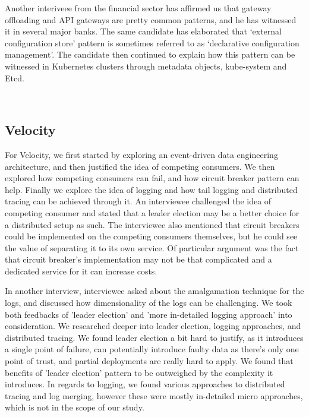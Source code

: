 \documentclass{bmcart}
\begin{document}
Another interiveee from the financial sector has affirmed us that gateway offloading and API gateways are pretty common patterns, and he has witnessed it in several major banks. The same candidate has elaborated that `external configuration store' pattern is sometimes referred to as `declarative configuration management'. The candidate then continued to explain how this pattern can be witnessed in Kubernetes clusters through metadata objects, kube-system and Etcd.


\,

\setlength{\fboxsep}{0.7em}
\noindent{}


\subsection{Velocity}

For Velocity, we first started by exploring an event-driven data engineering architecture, and then justified the idea of competing consumers. We then explored how competing consumers can fail, and how circuit breaker pattern can help. Finally we explore the idea of logging and how tail logging and distributed tracing can be achieved through it. An interviewee challenged the idea of competing consumer and stated that a leader election may be a better choice for a distributed setup as such. The interviewee also mentioned that circuit breakers could be implemented on the competing consumers themselves, but he could see the value of separating it to its own service. Of particular argument was the fact that circuit breaker's implementation may not be that complicated and a dedicated service for it can increase costs.  

In another interview, interviewee asked about the amalgamation technique for the logs, and discussed how dimensionality of the logs can be challenging. We took both feedbacks of 'leader election' and 'more in-detailed logging approach' into consideration. We researched deeper into leader election, logging approaches, and distributed tracing. We found leader election a bit hard to justify, as it introduces a single point of failure, can potentially introduce faulty data as there's only one point of trust, and partial deployments are really hard to apply. We found that benefits of 'leader election' pattern to be outweighed by the complexity it introduces. In regards to logging, we found various approaches to distributed tracing and log merging, however these were mostly in-detailed micro approaches, which is not in the scope of our study. 
\end{document}
